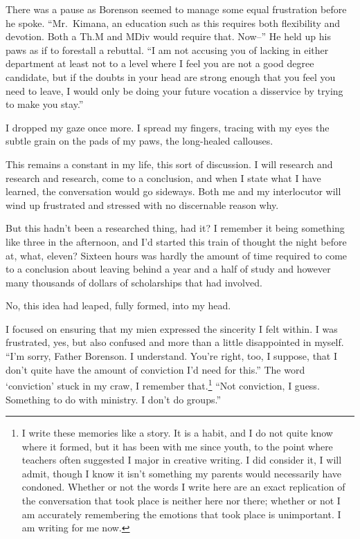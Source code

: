 There was a pause as Borenson seemed to manage some equal frustration before he spoke. ``Mr.~Kimana, an education such as this requires both flexibility and devotion. Both a Th.M and MDiv would require that. Now--'' He held up his paws as if to forestall a rebuttal. ``I am not accusing you of lacking in either department at least not to a level where I feel you are not a good degree candidate, but if the doubts in your head are strong enough that you feel you need to leave, I would only be doing your future vocation a disservice by trying to make you stay.''

I dropped my gaze once more. I spread my fingers, tracing with my eyes the subtle grain on the pads of my paws, the long-healed callouses.

This remains a constant in my life, this sort of discussion. I will research and research and research, come to a conclusion, and when I state what I have learned, the conversation would go sideways. Both me and my interlocutor will wind up frustrated and stressed with no discernable reason why.

But this hadn't been a researched thing, had it? I remember it being something like three in the afternoon, and I'd started this train of thought the night before at, what, eleven? Sixteen hours was hardly the amount of time required to come to a conclusion about leaving behind a year and a half of study and however many thousands of dollars of scholarships that had involved.

No, this idea had leaped, fully formed, into my head.

I focused on ensuring that my mien expressed the sincerity I felt within. I was frustrated, yes, but also confused and more than a little disappointed in myself. ``I'm sorry, Father Borenson. I understand. You're right, too, I suppose, that I don't quite have the amount of conviction I'd need for this.'' The word `conviction' stuck in my craw, I remember that.\footnote{I write these memories like a story. It is a habit, and I do not quite know where it formed, but it has been with me since youth, to the point where teachers often suggested I major in creative writing. I did consider it, I will admit, though I know it isn't something my parents would necessarily have condoned. Whether or not the words I write here are an exact replication of the conversation that took place is neither here nor there; whether or not I am accurately remembering the emotions that took place is unimportant. I am writing for me now.} ``Not conviction, I guess. Something to do with ministry. I don't do groups.''


